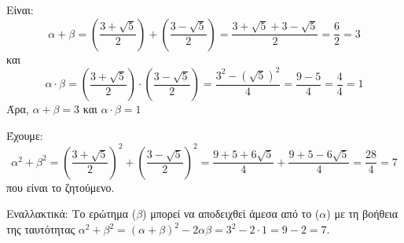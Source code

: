 
\begin{alist}
\item Είναι:
\[\alpha + \beta = \left(\dfrac{3 + \sqrt{5}}{2}\right) + \left(\dfrac{3 - \sqrt{5}}{2}\right) = \dfrac{3 + \sqrt{5} + 3 - \sqrt{5}}{2} = \dfrac{6}{2} = 3\]
και
\[\alpha \cdot \beta = \left(\dfrac{3 + \sqrt{5}}{2}\right) \cdot \left(\dfrac{3 - \sqrt{5}}{2}\right) = \dfrac{3^2 - (\sqrt{5})^2}{4} = \dfrac{9 - 5}{4} = \dfrac{4}{4} = 1\]
Άρα, $\alpha + \beta = 3$ και $\alpha \cdot \beta = 1$

\item Έχουμε:
\[\alpha^2 + \beta^2 = \left(\dfrac{3 + \sqrt{5}}{2}\right)^2 + \left(\dfrac{3 - \sqrt{5}}{2}\right)^2 = \dfrac{9 + 5 + 6\sqrt{5}}{4} + \dfrac{9 + 5 - 6\sqrt{5}}{4} = \dfrac{28}{4} = 7\]
που είναι το ζητούμενο.

Εναλλακτικά:
Το ερώτημα ($\beta$) μπορεί να αποδειχθεί άμεσα από το ($\alpha$) με τη βοήθεια της ταυτότητας $\alpha^2 + \beta^2 = (\alpha + \beta)^2 - 2\alpha\beta = 3^2 - 2 \cdot 1 = 9 - 2 = 7$.
\end{alist}


